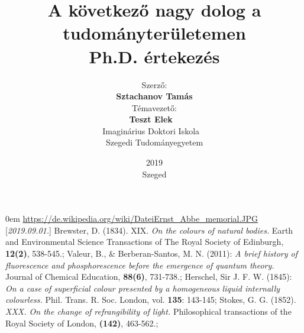 \documentclass[12pt,a4paper,titlepage,twoside]{article}
\title
{
	\textbf{A következő nagy dolog a tudományterületemen} \\
	\vspace{0.5cm}
	Ph.D. értekezés
}
\author
{
	Szerző:
	\\\textbf{Sztachanov Tamás}	
	\\[2cm]Témavezető:
	\\\textbf{Teszt Elek}
	~\\[4cm]Imaginárius Doktori Iskola
	~\\Szegedi Tudományegyetem
}
\date
{
	2019\\ Szeged
}
\numberwithin{equation}{section}
\numberwithin{figure}{section}
\numberwithin{table}{section}
\begin{document}
\makeatother

\maketitle

\tableofcontents

\begin{spacing}{1.5}
\newpage
%
%
%
%
%
%
%
%
%

\end{spacing}
\begin{spacing}{1}
%
\begin{thebibliography}{99}
\itemsep0em
\href{https://de.wikipedia.org/wiki/Datei:Ernst_Abbe_memorial.JPG}{https://de.wikipedia.org/wiki/Datei\:Ernst\_Abbe\_memorial.JPG}
\mbox{[\textit{2019.09.01.}]}
Brewster, D. (1834). XIX. \textit{On the colours of natural bodies.} Earth and Environmental Science Transactions of The Royal Society of Edinburgh, \textbf{12(2)}, 538-545.;
\mbox{}
Valeur, B., \& Berberan-Santos, M. N. (2011): \textit{A brief history of fluorescence and phosphorescence before the emergence of quantum theory.} Journal of Chemical Education, \textbf{88(6)}, 731-738.;
\mbox{}
Herschel, Sir J. F. W. (1845): \textit{On a case of superficial colour presented by a homogeneous liquid internally colourless.}  Phil. Trans. R. Soc. London, vol. \textbf{135}: 143-145;
\mbox{}
Stokes, G. G. (1852). \textit{XXX. On the change of refrangibility of light.} Philosophical transactions of the Royal Society of London, \textbf{(142)}, 463-562.;
\mbox{}
\end{thebibliography}
\end{spacing}
\end{document}
